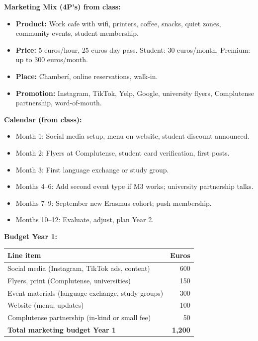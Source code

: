 \documentclass[12pt,a4paper]{article}
\begin{document}
\textbf{\textcolor{cafebrown}{Marketing Mix (4P's) from class:}}
\begin{itemize}[leftmargin=*,nosep]
\item \textbf{Product:} Work cafe with wifi, printers, coffee, snacks, quiet zones, community events, student membership.
\item \textbf{Price:} 5 euros/hour, 25 euros day pass. Student: 30 euros/month. Premium: up to 300 euros/month.
\item \textbf{Place:} Chamber\'i, online reservations, walk-in.
\item \textbf{Promotion:} Instagram, TikTok, Yelp, Google, university flyers, Complutense partnership, word-of-mouth.
\end{itemize}

\textbf{\textcolor{cafebrown}{Calendar (from class):}}
\begin{itemize}[leftmargin=*,nosep]
\item Month 1: Social media setup, menu on website, student discount announced.
\item Month 2: Flyers at Complutense, student card verification, first posts.
\item Month 3: First language exchange or study group.
\item Months 4--6: Add second event type if M3 works; university partnership talks.
\item Months 7--9: September new Erasmus cohort; push membership.
\item Months 10--12: Evaluate, adjust, plan Year 2.
\end{itemize}

\textbf{\textcolor{cafebrown}{Budget Year 1:}}

\begin{center}
\small
\begin{tabular}{@{}p{9cm}r@{}}
\toprule
\rowcolor{sectionblue!15}
\textbf{\textcolor{sectionblue}{Line item}} & \textbf{\textcolor{sectionblue}{Euros}} \\
\midrule
Social media (Instagram, TikTok ads, content) & 600 \\
Flyers, print (Complutense, universities) & 150 \\
Event materials (language exchange, study groups) & 300 \\
Website (menu, updates) & 100 \\
Complutense partnership (in-kind or small fee) & 50 \\
\midrule
\textbf{Total marketing budget Year 1} & \textbf{1,200} \\
\bottomrule
\end{tabular}
\end{center}
\end{document}
